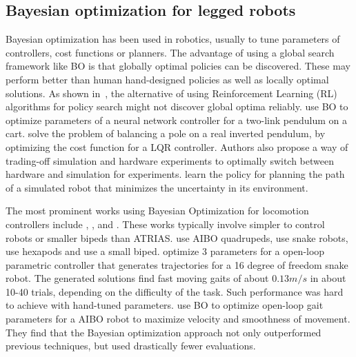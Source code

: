\subsection{Bayesian optimization for legged robots}

Bayesian optimization has been used in robotics, usually to tune parameters of controllers, cost functions or planners. The advantage of using a global search framework like BO is that globally optimal policies can be discovered. These may perform better than human hand-designed policies as well as locally optimal solutions. As shown in~\cite{englert2016combined}, the alternative of using Reinforcement Learning (RL) algorithms for policy search might not discover global optima reliably. \cite{frean2008using} use BO to optimize parameters of a neural network controller for a two-link pendulum on a cart. \cite{marco2017virtual} solve the problem of balancing a pole on a real inverted pendulum, by optimizing the cost function for a LQR controller. Authors also propose a way of trading-off simulation and hardware experiments to optimally switch between hardware and simulation for experiments. \cite{martinez2007active} learn the policy for planning the path of a simulated robot that minimizes the uncertainty in its environment.

The most prominent works using Bayesian Optimization for locomotion controllers include \cite{lizotte2007automatic}, \cite{tesch}, \cite{cully2015robots} and \cite{calandra17thesis}. These works typically involve simpler to control robots or smaller bipeds than ATRIAS. \cite{lizotte2007automatic} use AIBO quadrupeds, \cite{tesch} use snake robots, \cite{cully2015robots} use hexapods and \cite{calandra2016bayesian} use a small biped.  \cite{tesch} optimize 3 parameters for a open-loop parametric controller that generates trajectories for a 16 degree of freedom snake robot. The generated solutions find fast moving gaits of about $0.13m/s$ in about 10-40 trials, depending on the difficulty of the task. Such performance was hard to achieve with hand-tuned parameters. \cite{lizotte2007automatic} use BO to optimize open-loop gait parameters for a AIBO robot to maximize velocity and smoothness of movement. They find that the Bayesian optimization
approach not only outperformed previous techniques, but used drastically
fewer evaluations.


